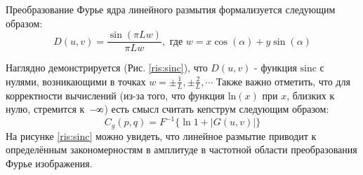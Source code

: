  Преобразование Фурье ядра линейного размытия формализуется следующим образом:
\begin{equation}
D(u, v)=\frac{\sin (\pi L w)}{\pi L w}, \text{ где } w = x \cos(\alpha) + y \sin(\alpha)
\label{motion_blur_fourier}
\end{equation}
\par

Наглядно демонстрируется (Рис. \ref{ris:sinc}), что $D(u,v)$ - функция $\text {sinc}$ с нулями, возникающими в точках $w=\pm \frac{1}{L}, \pm \frac{2}{L}, \cdots$
Также важно отметить, что для корректности вычислений (из-за того, что функция $\text {ln}(x)$ 
при $x$, близких к нулю, стремится к~$-\infinity$) есть смысл считать кепструм следующим образом:
$$C_{g}(p, q)=F^{-1}\{\ln 1+ |G(u, v)|\}$$
На рисунке \ref{ris:sinc} можно увидеть, что линейное размытие приводит к определённым закономерностям в амплитуде в частотной области преобразования Фурье изображения.
\par

